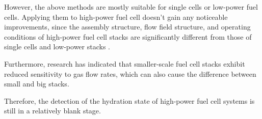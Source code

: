 \par
However, the above methods are mostly suitable for single cells or low-power fuel cells. Applying them to high-power fuel cell doesn't gain any noticeable improvements\cite{tangRecentProgressUse2020,jiangMicrobialFuelCell2018,dotelliCombiningElectricalPressure2016,millerReviewPolymerElectrolyte2011,nagulapatiMachineLearningBased2023}, since the assembly structure, flow field structure, and operating conditions of high-power fuel cell stacks are significantly different from those of single cells and low-power stacks \cite{verhaertWaterManagementAlkaline2011}.
\par
Furthermore, research has indicated that smaller-scale fuel cell stacks exhibit reduced sensitivity to gas flow rates\cite{bonnetDesign80kWePEM2008}, which can also cause the difference between small and big stacks.

Therefore, the detection of the hydration state of high-power fuel cell systems is still in a relatively blank stage.


